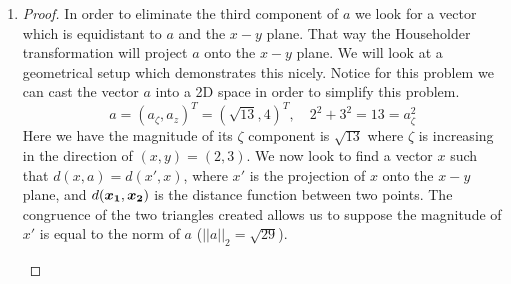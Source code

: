 \documentclass{article}
\begin{document}
\begin{enumerate}
\begin{enumerate}
\item 
\begin{proof}
    In order to eliminate the third component of $a$ we look for a vector which is equidistant to $a$ and the $x-y$ plane. That way the Householder transformation will project $a$ onto the $x-y$ plane. We will look at a geometrical setup which demonstrates this nicely. Notice for this problem we can cast the vector $a$ into a 2D space in order to simplify this problem. 
    \[
        a = (a_{\zeta}, a_z)^T = (\sqrt{13}, 4)^T, \quad 2^2 + 3^2 = 13 = a_{\zeta}^2
    \]
    Here we have the magnitude of its $\zeta$ component is $\sqrt{13}$ where $\zeta$ is increasing in the direction of $(x, y) = (2, 3)$. We now look to find a vector $x$ such that $d(x, a) = d(x', x)$, where $x'$ is the projection of $x$ onto the $x-y$ plane, and $d(\boldsymbol{x_1}, \boldsymbol{x_2})$ is the distance function between two points. The congruence of the two triangles created allows us to suppose the magnitude of $x'$ is equal to the norm of $a$ ($||a||_2 = \sqrt{29}$).

    \begin{center}
    \end{center}


\end{proof}
\end{enumerate}
\end{enumerate}
\end{document}
